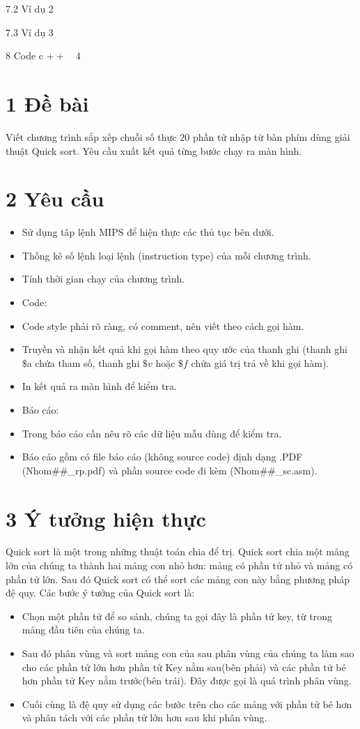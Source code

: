\documentclass[a4paper]{article}
\begin{document}
7.2 Ví dụ 2

7.3 Ví dụ 3

8 Code c $++\quad 4$

\section*{1 Đề bài}
Viết chương trình sắp xếp chuỗi số thực 20 phần tử nhập từ bàn phím dùng giải thuật Quick sort. Yêu cầu xuất kết quả từng bước chạy ra màn hình.

\section*{2 Yêu cầu}
\begin{itemize}
  \item Sử dụng tâp lệnh MIPS để hiện thực các thủ tục bên dưới.
  \item Thống kê số lệnh loại lệnh (instruction type) của mỗi chương trình.
  \item Tính thời gian chạy của chương trình.
  \item Code:
  \item Code style phải rõ ràng, có comment, nên viết theo cách gọi hàm.
  \item Truyền và nhận kết quả khi gọi hàm theo quy ước của thanh ghi (thanh ghi \$a chứa tham số, thanh ghi $\$ v$ hoặc $\$ f$ chứa giá trị trả về khi gọi hàm).
  \item In kết quả ra màn hình để kiểm tra.
  \item Báo cáo:
  \item Trong báo cáo cần nêu rõ các dữ liệu mẫu dùng để kiểm tra.
  \item Báo cáo gồm có file báo cáo (không source code) định dạng .PDF (Nhom\#\#\_rp.pdf) và phần source code đi kèm (Nhom\#\#\_sc.asm).
\end{itemize}

\section*{3 Ý tưởng hiện thực}
Quick sort là một trong những thuật toán chia để trị. Quick sort chia một mảng lớn của chúng ta thành hai mảng con nhỏ hơn: mảng có phần tử nhỏ và mảng có phần tử lớn. Sau đó Quick sort có thể sort các mảng con này bằng phương pháp đệ quy. Các bước ý tưởng của Quick sort là:

\begin{itemize}
  \item Chọn một phần tử để so sánh, chúng ta gọi đây là phần tử key, từ trong mảng đầu tiên của chúng ta.
  \item Sau đó phân vùng và sort mảng con của sau phân vùng của chúng ta làm sao cho các phần tử lớn hơn phần tử Key nằm sau(bên phải) và các phần tử bé hơn phần tử Key nằm trước(bên trái). Đây được gọi là quá trình phân vùng.
  \item Cuối cùng là đệ quy sử dụng các bước trên cho các mảng với phần tử bé hơn và phân tách với các phần tử lớn hơn sau khi phân vùng.
\end{itemize}
\end{document}
